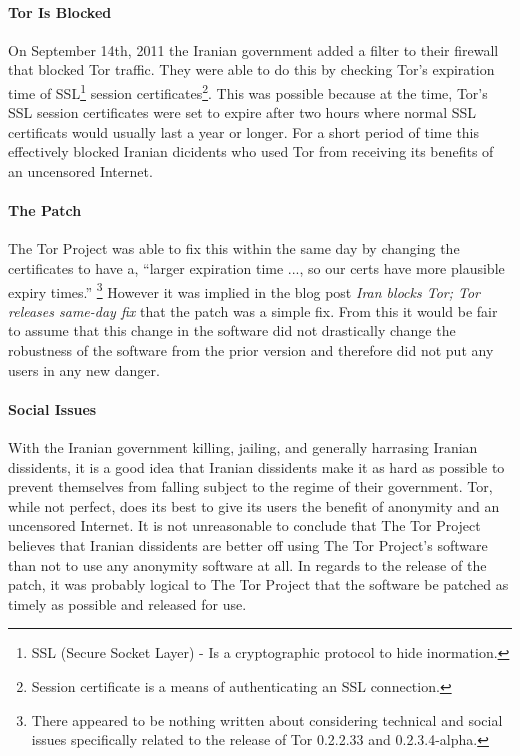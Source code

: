 \documentclass[11pt]{article}
\begin{document}
\begin{multicols}{2}
\paragraph{Tor Is Blocked}

On September 14th, 2011 the Iranian government added a filter to their firewall
that blocked Tor traffic. They were able to do this by checking Tor's expiration
time of SSL\footnote{SSL (Secure Socket Layer) - Is a cryptographic protocol to
hide inormation.} session certificates\footnote{Session certificate is a
means of authenticating an SSL connection.}. This was possible because at the
time, Tor's SSL session certificates were set to expire after two hours where normal SSL
certificats would usually last a year or longer. For a short period of time this
effectively blocked Iranian dicidents who used Tor from receiving its benefits
of an uncensored Internet.\cite{IranBlocksTorSameDayFix}

\paragraph{The Patch} 

The Tor Project was able to fix this within the same day by changing the
certificates to have a, ``larger expiration time ..., so our certs have more
plausible expiry times.''\cite{IranBlocksTorSameDayFix} \footnote{There appeared to be
nothing written about considering technical and social issues specifically
related to the release of Tor 0.2.2.33 and 0.2.3.4-alpha.}  However it was
implied in the blog post \textit{Iran blocks Tor; Tor releases same-day fix}
that the patch was a simple fix.\cite{IranBlocksTorSameDayFix} From this it
would be fair to assume that this change in the software did not drastically
change the robustness of the software from the prior version and therefore did
not put any users in any new danger.

\paragraph{Social Issues}

With the Iranian government killing, jailing, and generally harrasing Iranian
dissidents, it is a good idea that Iranian dissidents make it as hard as
possible to prevent themselves from falling subject to the regime of their
government.  Tor, while not perfect, does its best to give its users the benefit
of anonymity and an uncensored Internet. It is not unreasonable to conclude that
The Tor Project believes that Iranian dissidents are better off using The Tor
Project's software than not to use any anonymity software at all. In regards to
the release of the patch, it was probably logical to The Tor Project that the
software be patched as timely as possible and released for use.


\end{multicols}
\end{document}
